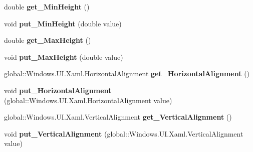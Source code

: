 \begin{DoxyCompactItemize}
double {\bfseries get\+\_\+\+Min\+Height} ()
\item 
\mbox{\label{interface_windows_1_1_u_i_1_1_xaml_1_1_i_framework_element_a40a39aa19edb81ecda1099fb601ca3b4}} 
void {\bfseries put\+\_\+\+Min\+Height} (double value)
\item 
\mbox{\label{interface_windows_1_1_u_i_1_1_xaml_1_1_i_framework_element_a7fd2781c3f760e605441d9dda430e90d}} 
double {\bfseries get\+\_\+\+Max\+Height} ()
\item 
\mbox{\label{interface_windows_1_1_u_i_1_1_xaml_1_1_i_framework_element_aea77c6cfc78af44390a3dfc2768ab96b}} 
void {\bfseries put\+\_\+\+Max\+Height} (double value)
\item 
\mbox{\label{interface_windows_1_1_u_i_1_1_xaml_1_1_i_framework_element_a60effb1f7f1912daafa8558633745836}} 
global\+::\+Windows.\+U\+I.\+Xaml.\+Horizontal\+Alignment {\bfseries get\+\_\+\+Horizontal\+Alignment} ()
\item 
\mbox{\label{interface_windows_1_1_u_i_1_1_xaml_1_1_i_framework_element_a94803d051b65803464005eaca8d55c70}} 
void {\bfseries put\+\_\+\+Horizontal\+Alignment} (global\+::\+Windows.\+U\+I.\+Xaml.\+Horizontal\+Alignment value)
\item 
\mbox{\label{interface_windows_1_1_u_i_1_1_xaml_1_1_i_framework_element_a5c99e9c5ee87e9df550209699e7666f7}} 
global\+::\+Windows.\+U\+I.\+Xaml.\+Vertical\+Alignment {\bfseries get\+\_\+\+Vertical\+Alignment} ()
\item 
\mbox{\label{interface_windows_1_1_u_i_1_1_xaml_1_1_i_framework_element_aad18ff5b25e09bbbcc7f6a3b5519e4ab}} 
void {\bfseries put\+\_\+\+Vertical\+Alignment} (global\+::\+Windows.\+U\+I.\+Xaml.\+Vertical\+Alignment value)
\item 
\mbox{\label{interface_windows_1_1_u_i_1_1_xaml_1_1_i_framework_element_a4b7dbc2a4b60e47ea9bfe8bc5ee3ad33}} 

\end{DoxyCompactItemize}
